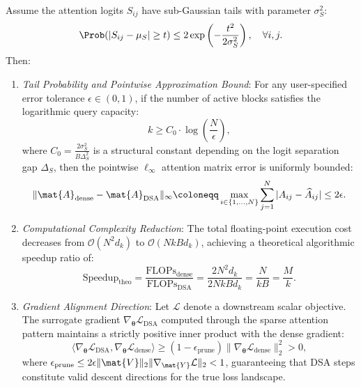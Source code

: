 \begin{theorem}
Assume the attention logits $S_{ij}$ have sub-Gaussian tails with parameter $\sigma_S^2$:
\begin{equation}
\Prob(|S_{ij} - \mu_S| \ge t) \le 2 \exp\left( -\frac{t^2}{2 \sigma_S^2} \right), \quad \forall i, j.
\end{equation}
Then:
\begin{enumerate}
    \item \emph{Tail Probability and Pointwise Approximation Bound}:
    For any user-specified error tolerance $\epsilon \in (0, 1)$, if the number of active blocks satisfies the logarithmic query capacity:
    \begin{equation}
    k \ge C_0 \cdot \log\left( \frac{N}{\epsilon} \right),
    \label{eq:dsa_logarithmic_capacity}
    \end{equation}
    where $C_0 = \frac{2 \sigma_S^2}{B \Delta_S^2}$ is a structural constant depending on the logit separation gap $\Delta_S$, then the pointwise $\ell_\infty$ attention matrix error is uniformly bounded:
    \begin{equation}
    \|\mat{A}_{\text{dense}} - \mat{A}_{\text{DSA}}\|_\infty \coloneqq \max_{i \in \{1, \dots, N\}} \sum_{j=1}^N |A_{ij} - \widehat{A}_{ij}| \le 2 \epsilon.
    \label{app:eq:dsa_linfty_bound}
    \end{equation}
    \item \emph{Computational Complexity Reduction}:
    The total floating-point execution cost decreases from $\mathcal{O}(N^2 d_k)$ to $\mathcal{O}(N k B d_k)$, achieving a theoretical algorithmic speedup ratio of:
    \begin{equation}
    \text{Speedup}_{\text{theo}} = \frac{\text{FLOPs}_{\text{dense}}}{\text{FLOPs}_{\text{DSA}}} = \frac{2 N^2 d_k}{2 N k B d_k} = \frac{N}{k B} = \frac{M}{k}.
    \label{app:eq:dsa_speedup_ratio}
    \end{equation}
    \item \emph{Gradient Alignment Direction}:
    Let $\mathcal{L}$ denote a downstream scalar objective. The surrogate gradient $\nabla_{\bm{\theta}} \mathcal{L}_{\text{DSA}}$ computed through the sparse attention pattern maintains a strictly positive inner product with the dense gradient:
    \begin{equation}
    \langle \nabla_{\bm{\theta}} \mathcal{L}_{\text{DSA}}, \nabla_{\bm{\theta}} \mathcal{L}_{\text{dense}} \rangle \ge (1 - \epsilon_{\text{prune}}) \|\nabla_{\bm{\theta}} \mathcal{L}_{\text{dense}}\|_2^2 > 0,
    \label{eq:dsa_gradient_alignment}
    \end{equation}
    where $\epsilon_{\text{prune}} \le 2 \epsilon \|\mat{V}\|_2 \|\nabla_{\mat{Y}} \mathcal{L}\|_2 < 1$, guaranteeing that DSA steps constitute valid descent directions for the true loss landscape.
\end{enumerate}
\end{theorem}

